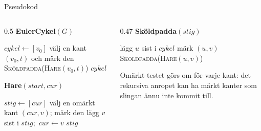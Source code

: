 \documentclass[11pt,aspectratio=169,xcolor=table,t]{beamer}
\begin{document}
\begin{frame}{Pseudokod}
\begin{columns}[T]
\begin{column}{0.5\textwidth}
{\small\bfseries\color{kthnavy}EulerCykel$(G)$}
\footnotesize
\begin{algorithmic}[1]
\State $\mathit{cykel}\gets[v_0]$
\State välj en kant $(v_0,t)$ och märk den
\State \textsc{Sköldpadda}(\textsc{Hare}$(v_0,t)$)
\State \Return $\mathit{cykel}$
\end{algorithmic}
\medskip
{\small\bfseries\color{kthorange}Hare$(\mathit{start},\mathit{cur})$}
\footnotesize
\begin{algorithmic}[1]
\State $\mathit{stig}\gets[\mathit{cur}]$
  \State välj en omärkt kant $(\mathit{cur},v)$; märk den
  \State lägg $v$ sist i $\mathit{stig}$;\ $\mathit{cur}\gets v$
\EndWhile
\State \Return $\mathit{stig}$
\end{algorithmic}
\end{column}
\begin{column}{0.47\textwidth}
{\small\bfseries\color{kthgreen}Sköldpadda$(\mathit{stig})$}
\footnotesize
\begin{algorithmic}[1]
  \State lägg $u$ sist i $\mathit{cykel}$
      \State märk $(u,v)$
      \State \textsc{Sköldpadda}(\textsc{Hare}$(u,v)$)
    \EndIf
  \EndFor
\EndFor
\end{algorithmic}
\medskip
\begin{infobox}[fontupper=\footnotesize]
Omärkt-testet görs om för varje kant: det rekursiva anropet kan ha märkt kanter som slingan
ännu inte kommit till.
\end{infobox}
\end{column}
\end{columns}
\end{frame}
\end{document}
